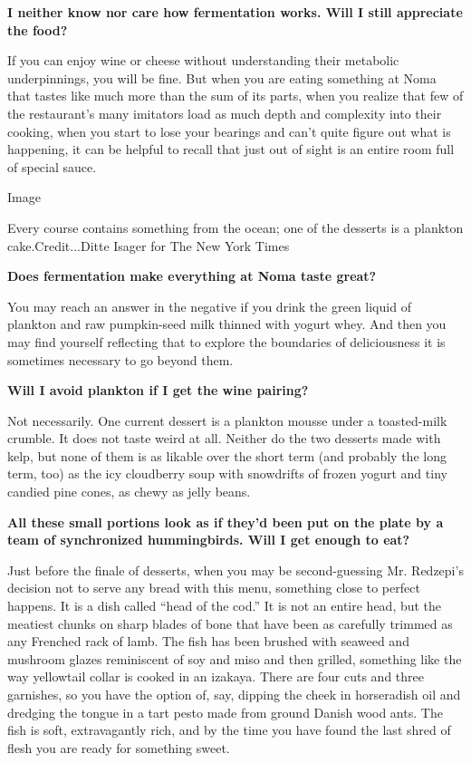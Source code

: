 \textbf{I neither know nor care how fermentation works. Will I still
appreciate the food?}

If you can enjoy wine or cheese without understanding their metabolic
underpinnings, you will be fine. But when you are eating something at
Noma that tastes like much more than the sum of its parts, when you
realize that few of the restaurant's many imitators load as much depth
and complexity into their cooking, when you start to lose your bearings
and can't quite figure out what is happening, it can be helpful to
recall that just out of sight is an entire room full of special sauce.

Image

Every course contains something from the ocean; one of the desserts is a
plankton cake.Credit...Ditte Isager for The New York Times

\textbf{Does fermentation make everything at Noma taste great?}

You may reach an answer in the negative if you drink the green liquid of
plankton and raw pumpkin-seed milk thinned with yogurt whey. And then
you may find yourself reflecting that to explore the boundaries of
deliciousness it is sometimes necessary to go beyond them.

\textbf{Will I avoid plankton if I get the wine pairing?}

Not necessarily. One current dessert is a plankton mousse under a
toasted-milk crumble. It does not taste weird at all. Neither do the two
desserts made with kelp, but none of them is as likable over the short
term (and probably the long term, too) as the icy cloudberry soup with
snowdrifts of frozen yogurt and tiny candied pine cones, as chewy as
jelly beans.

\textbf{All these small portions look as if they'd been put on the plate
by a team of synchronized hummingbirds. Will I get enough to eat?}

Just before the finale of desserts, when you may be second-guessing Mr.
Redzepi's decision not to serve any bread with this menu, something
close to perfect happens. It is a dish called ``head of the cod.'' It is
not an entire head, but the meatiest chunks on sharp blades of bone that
have been as carefully trimmed as any Frenched rack of lamb. The fish
has been brushed with seaweed and mushroom glazes reminiscent of soy and
miso and then grilled, something like the way yellowtail collar is
cooked in an izakaya. There are four cuts and three garnishes, so you
have the option of, say, dipping the cheek in horseradish oil and
dredging the tongue in a tart pesto made from ground Danish wood ants.
The fish is soft, extravagantly rich, and by the time you have found the
last shred of flesh you are ready for something sweet.

